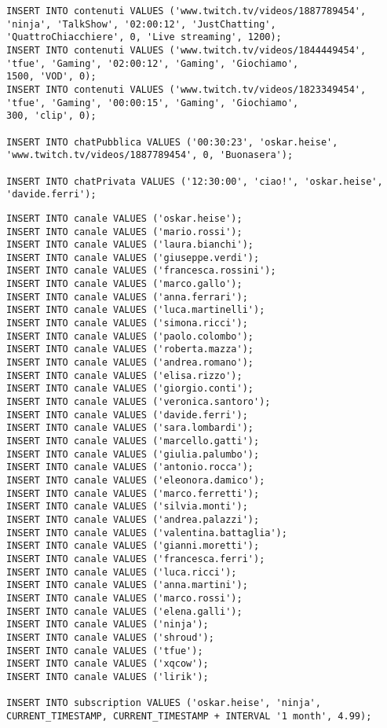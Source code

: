 \begin{lstlisting}
INSERT INTO contenuti VALUES ('www.twitch.tv/videos/1887789454',
'ninja', 'TalkShow', '02:00:12', 'JustChatting', 
'QuattroChiacchiere', 0, 'Live streaming', 1200);
INSERT INTO contenuti VALUES ('www.twitch.tv/videos/1844449454', 
'tfue', 'Gaming', '02:00:12', 'Gaming', 'Giochiamo',
1500, 'VOD', 0);
INSERT INTO contenuti VALUES ('www.twitch.tv/videos/1823349454', 
'tfue', 'Gaming', '00:00:15', 'Gaming', 'Giochiamo',
300, 'clip', 0);

INSERT INTO chatPubblica VALUES ('00:30:23', 'oskar.heise',
'www.twitch.tv/videos/1887789454', 0, 'Buonasera');

INSERT INTO chatPrivata VALUES ('12:30:00', 'ciao!', 'oskar.heise', 
'davide.ferri');
\end{lstlisting}

\begin{lstlisting}
INSERT INTO canale VALUES ('oskar.heise');
INSERT INTO canale VALUES ('mario.rossi');
INSERT INTO canale VALUES ('laura.bianchi');
INSERT INTO canale VALUES ('giuseppe.verdi');
INSERT INTO canale VALUES ('francesca.rossini');
INSERT INTO canale VALUES ('marco.gallo');
INSERT INTO canale VALUES ('anna.ferrari');
INSERT INTO canale VALUES ('luca.martinelli');
INSERT INTO canale VALUES ('simona.ricci');
INSERT INTO canale VALUES ('paolo.colombo');
INSERT INTO canale VALUES ('roberta.mazza');
INSERT INTO canale VALUES ('andrea.romano');
INSERT INTO canale VALUES ('elisa.rizzo');
INSERT INTO canale VALUES ('giorgio.conti');
INSERT INTO canale VALUES ('veronica.santoro');
INSERT INTO canale VALUES ('davide.ferri');
INSERT INTO canale VALUES ('sara.lombardi');
INSERT INTO canale VALUES ('marcello.gatti');
INSERT INTO canale VALUES ('giulia.palumbo');
INSERT INTO canale VALUES ('antonio.rocca');
INSERT INTO canale VALUES ('eleonora.damico');
INSERT INTO canale VALUES ('marco.ferretti');
INSERT INTO canale VALUES ('silvia.monti');
INSERT INTO canale VALUES ('andrea.palazzi');
INSERT INTO canale VALUES ('valentina.battaglia');
INSERT INTO canale VALUES ('gianni.moretti');
INSERT INTO canale VALUES ('francesca.ferri');
INSERT INTO canale VALUES ('luca.ricci');
INSERT INTO canale VALUES ('anna.martini');
INSERT INTO canale VALUES ('marco.rossi');
INSERT INTO canale VALUES ('elena.galli');
INSERT INTO canale VALUES ('ninja');
INSERT INTO canale VALUES ('shroud');
INSERT INTO canale VALUES ('tfue');
INSERT INTO canale VALUES ('xqcow');
INSERT INTO canale VALUES ('lirik');

INSERT INTO subscription VALUES ('oskar.heise', 'ninja', 
CURRENT_TIMESTAMP, CURRENT_TIMESTAMP + INTERVAL '1 month', 4.99);



\end{lstlisting}

